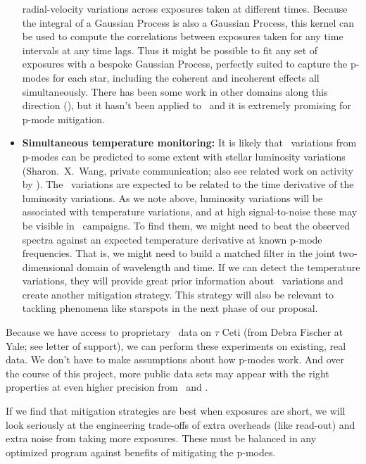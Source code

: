 \documentclass[12pt, letterpaper]{article}
\begin{document}
\begin{itemize}
radial-velocity variations across exposures taken at different times.
Because the integral of a Gaussian Process is also a Gaussian Process,
this kernel can be used to compute the correlations between exposures
taken for any time intervals at any time lags.
Thus it might be possible to fit any set of exposures with a bespoke
Gaussian Process, perfectly suited to capture the p-modes for each
star, including the coherent and incoherent effects all simultaneously.
There has been some work in other domains along this direction (\citealt{DFMGP}),
but it hasn't been applied to \EPRV\ and it is extremely
promising for p-mode mitigation.
\item
\textbf{Simultaneous temperature monitoring:}
It is likely that \RV\ variations from p-modes can be predicted
to some extent with stellar luminosity variations
(Sharon.~X.~Wang, private communication; also see related work on activity by \citealt{Aigrain}).
The \RV\ variations are expected to be related to the time derivative of the
luminosity variations.
As we note above, luminosity variations will be associated with
temperature variations, and at high signal-to-noise these may be
visible in \EPRV\ campaigns.
To find them, we might need to beat the observed spectra against an
expected temperature derivative at known p-mode frequencies.
That is, we might need to build a matched filter in the joint
two-dimensional domain of wavelength and time.
If we can detect the temperature variations, they will provide great
prior information about \RV\ variations and create another mitigation
strategy. 
This strategy will also be relevant to tackling phenomena like starspots in
the next phase of our proposal.
\end{itemize}

\noindent
Because we have access to proprietary \EXPRES\ data on $\tau$ Ceti 
(from Debra Fischer at Yale; see letter of support),
we can perform these experiments on existing, real data.
We don't have to make assumptions about how p-modes work.
And over the course of this project, more public data sets may appear
with the right properties at even higher precision from \ESPRESSO\ and \NEID.

If we find that mitigation strategies are best when exposures
are short, we will look seriously at the engineering trade-offs
of extra overheads (like read-out) and extra noise from taking
more exposures. These must be balanced in any optimized program
against benefits of mitigating the p-modes.
\end{document}
